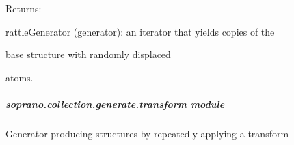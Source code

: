 \documentclass[letterpaper,10pt,english]{sphinxmanual}
\begin{document}
\begin{fulllineitems}
\begin{DUlineblock}{0em}
\item[] Returns:
\item[]
\begin{DUlineblock}{\DUlineblockindent}
\item[] rattleGenerator (generator): an iterator that yields copies of the
\item[]
\begin{DUlineblock}{\DUlineblockindent}
\item[] base structure with randomly displaced
\item[] atoms.
\end{DUlineblock}
\end{DUlineblock}
\end{DUlineblock}

\end{fulllineitems}



\subparagraph{soprano.collection.generate.transform module}
\label{doctree/soprano.collection.generate.transform:module-soprano.collection.generate.transform}\label{doctree/soprano.collection.generate.transform:soprano-collection-generate-transform-module}\label{doctree/soprano.collection.generate.transform::doc}
Generator producing structures by repeatedly applying a transform
\end{document}
